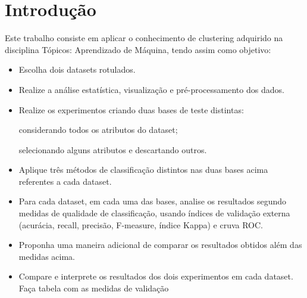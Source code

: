 \chapter{Introdução}\label{cap_intro}

Este trabalho consiste em aplicar o conhecimento de clustering adquirido na disciplina Tópicos: Aprendizado de Máquina, tendo assim como objetivo:

\begin{itemize}
	\item Escolha dois datasets rotulados.
	
	\item Realize a análise estatística, visualização e pré-processamento dos
	dados.
	
	\item Realize os experimentos criando duas bases de teste distintas:
	
	\subitem considerando todos os atributos do dataset;
	
	\subitem selecionando alguns atributos e descartando outros.
	
	\item Aplique três métodos de classificação distintos nas duas bases
	acima referentes a cada dataset.
	
	\item Para cada dataset, em cada uma das bases, analise os resultados
	segundo medidas de qualidade de classificação, usando índices de
	validação externa (acurácia, recall, precisão, F-measure, índice
	Kappa) e cruva ROC.
	
	\item Proponha uma maneira adicional de comparar os resultados obtidos
	além das medidas acima.
	
	\item Compare e interprete os resultados dos dois experimentos em cada
	dataset. Faça tabela com as medidas de validação
\end{itemize}
